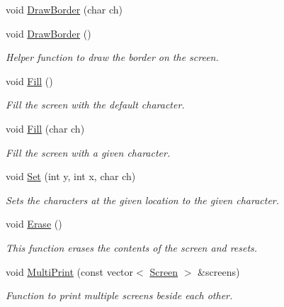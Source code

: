 \begin{DoxyCompactItemize}
void \hyperlink{classScreen_abe4420082458330e5c853c342b201956}{Draw\-Border} (char ch)
\item 
void \hyperlink{classScreen_a146a94183c6c610ae8a619521fc9d102}{Draw\-Border} ()
\begin{DoxyCompactList}\small\item\em Helper function to draw the border on the screen. \end{DoxyCompactList}\item 
void \hyperlink{classScreen_a8cf89892a333f7d6e7227ffdf77b3351}{Fill} ()
\begin{DoxyCompactList}\small\item\em Fill the screen with the default character. \end{DoxyCompactList}\item 
void \hyperlink{classScreen_aeeebb297b5f39c2b25ee026df8fec9ac}{Fill} (char ch)
\begin{DoxyCompactList}\small\item\em Fill the screen with a given character. \end{DoxyCompactList}\item 
void \hyperlink{classScreen_ab035671163a5cabee7611c7c456b1c56}{Set} (int y, int x, char ch)
\begin{DoxyCompactList}\small\item\em Sets the characters at the given location to the given character. \end{DoxyCompactList}\item 
void \hyperlink{classScreen_a7e2c21a6e63390eb3d8b46ee85af05d2}{Erase} ()
\begin{DoxyCompactList}\small\item\em This function erases the contents of the screen and resets. \end{DoxyCompactList}\item 
void \hyperlink{classScreen_af2db1ce1cd4beb8fec5f022bfbeb0c31}{Multi\-Print} (const vector$<$ \hyperlink{classScreen}{Screen} $>$ \&screens)
\begin{DoxyCompactList}\small\item\em Function to print multiple screens beside each other. \end{DoxyCompactList}\end{DoxyCompactItemize}
